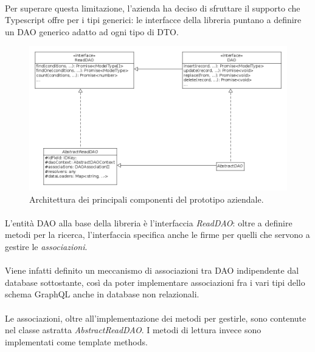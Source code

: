 \documentclass[a4paper, 12pt]{report}
\begin{document}
      \paragraph*{}
      Per superare questa limitazione, l'azienda ha deciso di sfruttare il supporto che Typescript offre per i tipi generici: le interfacce della libreria puntano a definire un DAO generico adatto ad ogni tipo di DTO.
      \begin{figure}[H]
        \includegraphics[width=\textwidth]{prototype-architecture.png}
        \caption{Architettura dei principali componenti del prototipo aziendale.}
      \end{figure}
      \paragraph*{}
      L'entità DAO alla base della libreria è l'interfaccia \emph{ReadDAO}: oltre a definire metodi per la ricerca, l'interfaccia specifica anche le firme per quelli che servono a gestire le \emph{associazioni}.
      \paragraph*{}
      Viene infatti definito un meccanismo di associazioni tra DAO indipendente dal database sottostante, così da poter implementare associazioni fra i vari tipi dello schema GraphQL anche in database non relazionali.
      \paragraph*{}
      Le associazioni, oltre all'implementazione dei metodi per gestirle, sono contenute nel classe astratta \emph{AbstractReadDAO}.
      I metodi di lettura invece sono implementati come template methods.
\end{document}

